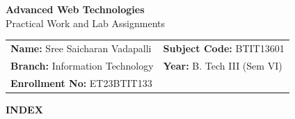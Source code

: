 \documentclass[a4paper,12pt]{article}
\begin{document}
\begin{center}
    {\LARGE \textbf{Advanced Web Technologies}} \\[6pt]
    {\large Practical Work and Lab Assignments} \\[16pt]
    \begin{tabular}{ll}
        \textbf{Name:} Sree Saicharan Vadapalli & \hspace{5em} \textbf{Subject Code:} BTIT13601 \\
        \textbf{Branch:} Information Technology & \hspace{5em} \textbf{Year:} B. Tech III (Sem VI) \\
        \textbf{Enrollment No:} ET23BTIT133 & \\
    \end{tabular}
\end{center}

\vspace{5pt}

\begin{center}
    {\large \textbf{INDEX}}
\end{center}

\vspace{6pt}
\end{document}
